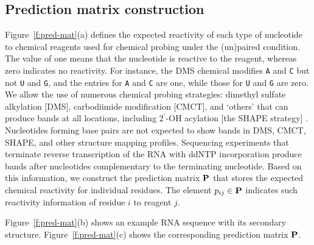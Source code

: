 \subsection{Prediction matrix construction}\label{ss:pred_mat}
Figure~\ref{f:pred-mat}(a) defines the expected reactivity of each type of nucleotide to chemical reagents used for chemical probing under the (un)paired condition. The value of one means that the nucleotide is reactive to the reagent, whereas zero indicates no reactivity. For instance,  the DMS chemical modifies \texttt{A} and \texttt{C} but not \texttt{U} and \texttt{G}, and the entries for \texttt{A} and \texttt{C} are one, while those for \texttt{U} and \texttt{G} are zero. We allow the use of numerous chemical probing strategies: dimethyl sulfate alkylation [DMS], carbodiimide modification [CMCT], and `others' that can produce bands at all locations, including $2^{\prime}$-OH acylation [the SHAPE strategy] \citep{Kladwang2014}.  Nucleotides forming base pairs are not expected to show bands in DMS, CMCT, SHAPE, and other structure mapping profiles. Sequencing experiments that terminate reverse transcription of the RNA with ddNTP incorporation produce bands after nucleotides complementary to the terminating nucleotide. Based on this information, we construct the prediction matrix ${\mathbf{P}}$ that stores the expected chemical reactivity for individual residues. The element $p_{ij} \in {\mathbf{P}}$ indicates such reactivity information of residue $i$ to reagent $j$.

%

Figure~\ref{f:pred-mat}(b) shows an example RNA sequence with its secondary structure. Figure~\ref{f:pred-mat}(c) shows the corresponding prediction matrix ${\mathbf{P}}$.


